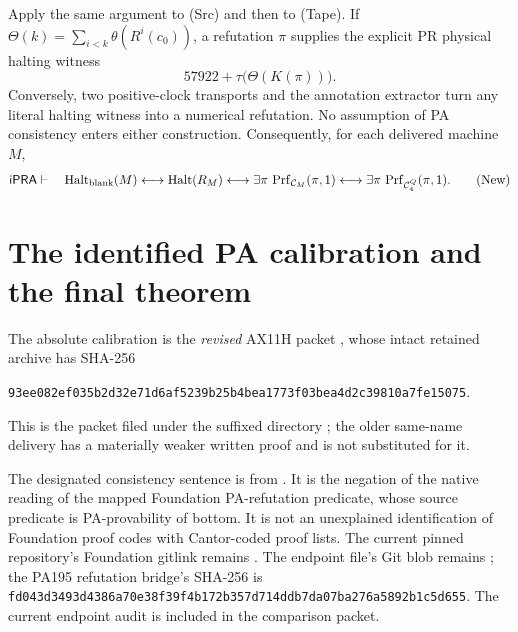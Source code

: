 Apply the same argument to (Src) and then to (Tape).  If
$\Theta(k)=\sum_{i<k}\theta(R^i(c_0))$, a refutation $\pi$ supplies
the explicit PR physical halting witness
\[
             57922+\tau\bigl(\Theta(K(\pi))\bigr).
\]
Conversely, two positive-clock transports and the annotation extractor
turn any literal halting witness into a numerical refutation.  No
assumption of PA consistency enters either construction.  Consequently,
for each delivered machine $M$,
\[
 \mathsf{iPRA}\vdash\quad
 \operatorname{Halt}_{\rm blank}(M)
 \longleftrightarrow\operatorname{Halt}(R_M)
 \longleftrightarrow\exists\pi\,\operatorname{Prf}_{\mathcal C_M}(\pi,1)
 \longleftrightarrow\exists\pi\,\operatorname{Prf}_{\mathcal C_4^Q}(\pi,1).
 \tag{New}
\]

\section{The identified PA calibration and the final theorem}
\label{sec:calibration}

The absolute calibration is the \emph{revised} AX11H packet
\cite{ax11h}, whose intact retained archive has SHA-256
\begin{center}\small
\nolinkurl{93ee082ef035b2d32e71d6af5239b25b4bea1773f03bea4d2c39810a7fe15075}.
\end{center}
This is the packet filed under the suffixed directory
; the older same-name delivery
has a materially weaker written proof and is not substituted for it.

The designated consistency sentence is
from .  It is the negation of the native
reading of the mapped Foundation PA-refutation predicate, whose source
predicate is PA-provability of bottom.  It is not an unexplained
identification of Foundation proof codes with Cantor-coded proof lists.
The current pinned repository's Foundation gitlink remains
.  The endpoint file's
Git blob remains ;
the PA195 refutation bridge's SHA-256 is
\nolinkurl{fd043d3493d4386a70e38f39f4b172b357d714ddb7da07ba276a5892b1c5d655}.
The current endpoint audit is included in the comparison packet.

